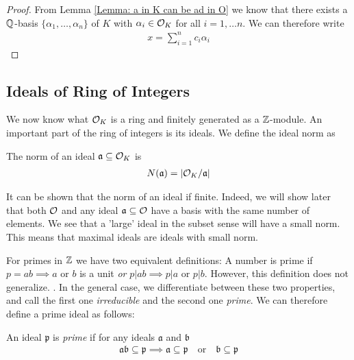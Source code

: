     \begin{proof}
        From Lemma \ref{Lemma: a in K can be ad in O} we know that there exists a \(\mathbb{Q}\)-basis \(\{\alpha_1,\dots ,\alpha_n\}\) of \(K\) with \(\alpha_i\in\mathcal{O}_K\) for all \(i = 1,\dots n\). We can therefore write
        \begin{align*}
            x = \sum\limits_{i = 1}^{n} c_i\alpha_i
        \end{align*}
        \cite{Basic Algebraic Number Theory}
    \end{proof}
    
\subsection{Ideals of Ring of Integers}
    We now know what \(\mathcal{O}_K\) is a ring and finitely generated as a \(\mathbb{Z}\)-module. An important part of the ring of integers is its ideals. We define the ideal norm as
    \begin{definition}
    The norm of an ideal \(\mathfrak{a}\subseteq \mathcal{O}_K\) is
    \begin{align*}
        N(\mathfrak{a}) = |\mathcal{O}_K/\mathfrak{a}|
    \end{align*}
    \end{definition}
    It can be shown that the norm of an ideal if finite. Indeed, we will show later that both \(\mathcal{O}\) and any ideal \(\mathfrak{a}\subseteq\mathcal{O}\) have a basis with the same number of elements. We see that a 'large' ideal in the subset sense will have a small norm. This means that maximal ideals are ideals with small norm.\par
    
    For primes in \(\mathbb{Z}\) we have two equivalent definitions: A number is prime if \(p=ab\implies a\text{ or }b \) is a unit \textit{or} \(p|ab\implies p|a \text{ or }p|b\). However, this definition does not generalize. \cite{Basic Algebraic Number Theory}. In the general case, we differentiate between these two properties, and call the first one \emph{irreducible} and the second one \emph{prime}. We can therefore define a prime ideal as follows:
    \begin{definition}
        An ideal \(\mathfrak{p}\) is \emph{prime} if for any ideals \(\mathfrak{a}\) and \(\mathfrak{b}\)
        \begin{align*}
            \mathfrak{a}\mathfrak{b}\subseteq \mathfrak{p} \implies \mathfrak{a}\subseteq \mathfrak{p}\quad\text{or}\quad \mathfrak{b}\subseteq \mathfrak{p}
        \end{align*}
    \end{definition}
    
